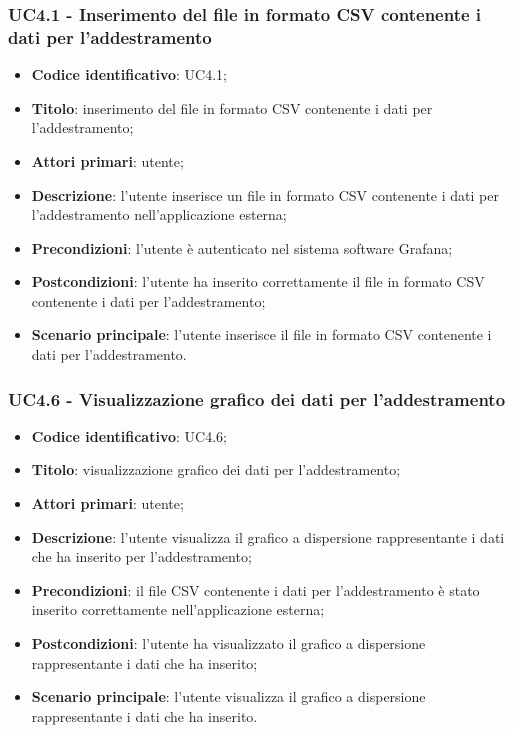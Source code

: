 \subsubsection{UC4.1 - Inserimento del file in formato CSV contenente i dati per l'addestramento}
\begin{itemize}
    \item \textbf{Codice identificativo}: UC4.1;
    \item \textbf{Titolo}: inserimento del file in formato CSV contenente i dati per l'addestramento;
    \item \textbf{Attori primari}: utente;
    \item \textbf{Descrizione}: l'utente inserisce un file in formato CSV contenente i dati per l'addestramento nell'applicazione esterna;
    \item \textbf{Precondizioni}: l'utente è autenticato nel sistema software Grafana\glo;
    \item \textbf{Postcondizioni}: l'utente ha inserito correttamente il file in formato CSV contenente i dati per l'addestramento;
    \item \textbf{Scenario principale}: l'utente inserisce il file in formato CSV contenente i dati per l'addestramento.
\end{itemize}
\subsubsection{UC4.6 - Visualizzazione grafico dei dati per l'addestramento}
\begin{itemize}
	\item \textbf{Codice identificativo}: UC4.6;
	\item \textbf{Titolo}: visualizzazione grafico dei dati per l'addestramento;
	\item \textbf{Attori primari}: utente;
	\item \textbf{Descrizione}: l'utente visualizza il grafico a dispersione rappresentante i dati che ha inserito per l'addestramento;
	\item \textbf{Precondizioni}: il file CSV contenente i dati per l'addestramento è stato inserito correttamente nell'applicazione esterna;
	\item \textbf{Postcondizioni}: l'utente ha visualizzato il grafico a dispersione rappresentante i dati che ha inserito;
	\item \textbf{Scenario principale}: l'utente visualizza il grafico a dispersione rappresentante i dati che ha inserito.
\end{itemize}
